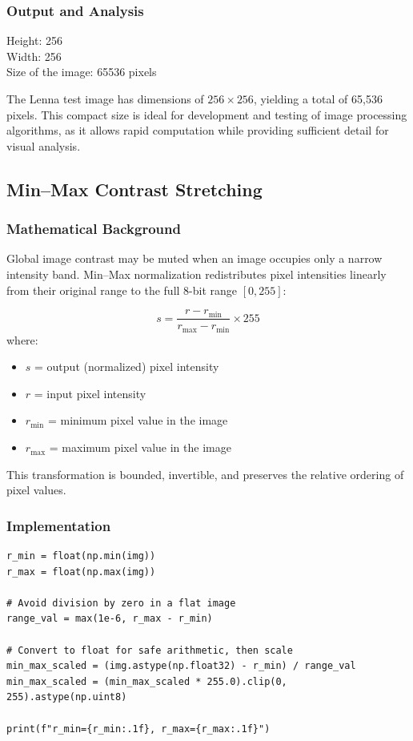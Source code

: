 \documentclass[a4paper,12pt]{article}
\begin{document}
\subsubsection{Output and Analysis}
\begin{tcolorbox}[title=Program Output]
Height: 256 \\
Width: 256 \\
Size of the image: 65536 pixels
\end{tcolorbox}

The Lenna test image has dimensions of $256 \times 256$, yielding a total of 65,536 pixels. This compact size is ideal for development and testing of image processing algorithms, as it allows rapid computation while providing sufficient detail for visual analysis.


\subsection{Min--Max Contrast Stretching}
\subsubsection{Mathematical Background}
Global image contrast may be muted when an image occupies only a narrow intensity band. Min--Max normalization redistributes pixel intensities linearly from their original range to the full 8-bit range $[0, 255]$:

\[ s = \frac{r - r_{\min}}{r_{\max}-r_{\min}}\times 255 \]
where:
\begin{itemize}
    \item $s$ = output (normalized) pixel intensity
    \item $r$ = input pixel intensity
    \item $r_{\min}$ = minimum pixel value in the image
    \item $r_{\max}$ = maximum pixel value in the image
\end{itemize}

This transformation is bounded, invertible, and preserves the relative ordering of pixel values.

\subsubsection{Implementation}
\begin{lstlisting}[style=pystyle, caption={Min--Max normalization with robust handling}, label={lst:minmax}]
r_min = float(np.min(img))
r_max = float(np.max(img))

# Avoid division by zero in a flat image
range_val = max(1e-6, r_max - r_min)

# Convert to float for safe arithmetic, then scale
min_max_scaled = (img.astype(np.float32) - r_min) / range_val
min_max_scaled = (min_max_scaled * 255.0).clip(0, 255).astype(np.uint8)

print(f"r_min={r_min:.1f}, r_max={r_max:.1f}")
\end{lstlisting}
\end{document}
